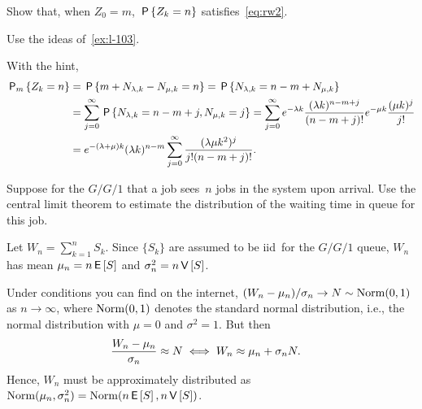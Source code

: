 \documentclass[queueing-book.tex]{subfiles}
\begin{document}
\begin{exercise}\label{ex:l-134}
 Show that, when $Z_0=m$,  $\P{Z_k=n}$ satisfies~\cref{eq:rw2}.
 \begin{hint}
Use the ideas of~\cref{ex:l-103}.
 \end{hint}
\begin{solution}
With the hint,
\begin{align*}
 \PP{m}{Z_k=n}
&= \P{m+N_{\lambda, k } - N_{\mu, k} = n }
= \P{N_{\lambda, k} = n - m + N_{\mu, k}} \\
&= \sum_{j=0}^\infty \P{N_{\lambda, k}  =  n - m + j, N_{\mu, k} =j}
= \sum_{j=0}^\infty e^{-\lambda k} \frac{(\lambda k )^{n - m + j}}{(n-m+j)!} e^{-\mu k} \frac{(\mu k )^j}{j!} \\
&= e^{-(\lambda+\mu)k} (\lambda k)^{n-m} \sum_{j=0}^\infty  \frac{(\lambda\mu k^2)^j} {j!(n-m+j)!}.
\end{align*}
\end{solution}
\end{exercise}




\begin{exercise}\label{ex:l-147}
 Suppose
 for the $G/G/1$ that a job sees~$n$ jobs in the system upon arrival.
 Use the central limit theorem to estimate the distribution of the waiting time in queue for this job.
\begin{hint}
 Let $W_{n} = \sum_{k=1}^n S_k$.
 Since $\{S_k\}$ are assumed to be iid\ for the $G/G/1$ queue, $W_{n}$ has mean $\mu_n = n \E S$ and $\sigma_n^2 = n\V S$.
\end{hint}
\begin{solution} Under conditions you can find on the internet, $(W_{n} - \mu_n)/\sigma_n \to N \sim \Norm{0,1}$ as $n\to \infty$,
 where $\Norm{0,1}$ denotes the standard normal distribution, i.e., the normal distribution with $\mu=0$ and $\sigma^2=1$. But then
 \begin{align*}
 \frac{\W_{n} - \mu_n}{\sigma_n} &\approx N \iff  W_{n} \approx \mu_{n} + \sigma_n N.
 \end{align*}
Hence, $ W_{n}$ must be approximately distributed as $\Norm{\mu_n,\sigma_n^2} = \Norm{n\E S, n \V S}$.
\end{solution}
\end{exercise}




\end{document}
